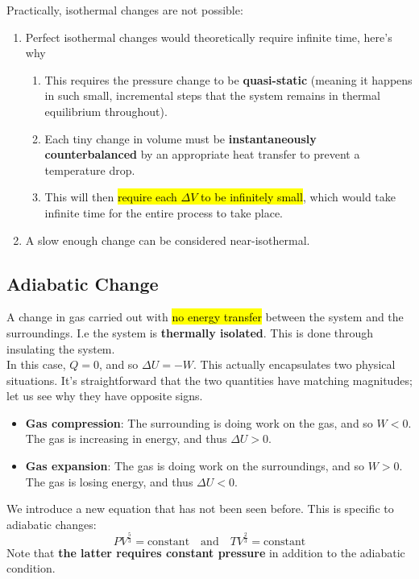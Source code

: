 \documentclass[a4paper,12pt]{article}
\newcommand{\eqand}{\quad \text{and} \quad}
\newcommand{\lb}{\\[8pt]}
\begin{document}
\pagebreak

Practically, isothermal changes are not possible:
\begin{enumerate}
  \item Perfect isothermal changes would theoretically require infinite time, here's why
        \begin{enumerate}
          \item This requires the pressure change to be \textbf{quasi-static} (meaning it happens in such small, incremental steps that the system remains in thermal equilibrium throughout).
          \item Each tiny change in volume must be \textbf{instantaneously counterbalanced} by an appropriate heat transfer to prevent a temperature drop.
          \item This will then \hl{require each $\Delta V$ to be infinitely small}, which would take infinite time for the entire process to take place.
        \end{enumerate}
  \item A slow enough change can be considered near-isothermal.
\end{enumerate}

\subsection{Adiabatic Change}

A change in gas carried out with \hl{no energy transfer} between the system and the surroundings. I.e the system is \textbf{thermally isolated}. This is done through insulating the system.\lb
In this case, $Q = 0$, and so $\Delta U = -W$. This actually encapsulates two physical situations. It's straightforward that the two quantities have matching magnitudes; let us see why they have opposite signs.
\begin{itemize}
  \item \textbf{Gas compression}: The surrounding is doing work on the gas, and so $W < 0$. The gas is increasing in energy, and thus $\Delta U > 0$.
  \item \textbf{Gas expansion}: The gas is doing work on the surroundings, and so $W > 0$. The gas is losing energy, and thus $\Delta U < 0$.
\end{itemize}

We introduce a new equation that has not been seen before. This is specific to adiabatic changes:
\begin{equation}\label{eq:adiabatic}
  PV^{\frac{5}{3}} = \text{constant} \eqand TV^{\frac{2}{3}} = \text{constant}
\end{equation}
Note that \textbf{the latter requires constant pressure} in addition to the adiabatic condition.
\end{document}
